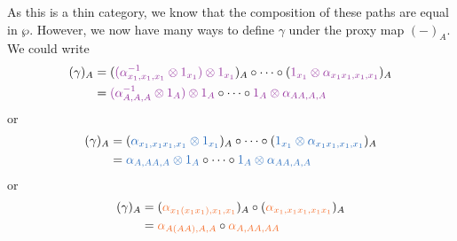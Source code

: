 \begin{example}
\begin{center}
{
    }
\end{center}
As this is a thin category, we know that the composition of these paths 
are equal in $\wp$. 
However, we now have many ways to define $\gamma$ under the proxy map $(-)_A$. 
We could write
\begin{align*}  
    (\gamma)_A &= 
    (\textcolor{Purple}{(\alpha^{-1}_{x_1,x_1,x_1}\otimes  1_{x_1})
    \otimes 1_{x_1}})_A \circ \cdots \circ 
    (\textcolor{Purple}{1_{x_1}\otimes \alpha_{x_1x_1, x_1, x_1}})_A
    \\
    &=\textcolor{Purple}{(\alpha^{-1}_{A,A,A}\otimes  1_{A})\otimes 1_{A}} \circ \cdots \circ \textcolor{Purple}{1_{A}\otimes \alpha_{AA, A, A}}
\end{align*} 
or 
\begin{align*}
    (\gamma)_A &= 
    (\textcolor{NavyBlue}{\alpha_{x_1, x_1x_1, x_1}\otimes 1_{x_1}})_A
    \circ \cdots \circ 
    (\textcolor{NavyBlue}{1_{x_1}\otimes \alpha_{x_1x_1, x_1, x_1}})_A\\
    &= 
    \textcolor{NavyBlue}{\alpha_{A, AA, A}\otimes 1_{A}}
    \circ \cdots \circ \textcolor{NavyBlue}{1_{A}\otimes \alpha_{AA, A, A}}
\end{align*}
or
\begin{align*}
    (\gamma)_A &= 
    (\textcolor{Orange}{\alpha_{x_1(x_1x_1),x_1, x_1}})_A\circ
    (\textcolor{Orange}{\alpha_{x_1, x_1x_1, x_1x_1}})_A\\
    &=
    \textcolor{Orange}{\alpha_{A(AA),A, A}} \circ \textcolor{Orange}{\alpha_{A, AA, AA}}

\end{align*}
\end{example}

